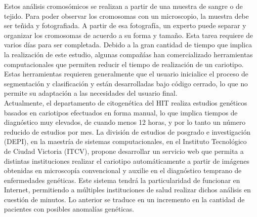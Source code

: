 \documentclass[12pt,letterpaper,titlepage]{article}
\begin{document}
Estos análisis cromosómicos se realizan a partir de una muestra de sangre o de tejido. Para poder observar los cromosomas con un microscopio, la muestra debe ser teñida y fotografiada. A partir de esa fotografía, un experto puede separar y organizar los cromosomas de acuerdo a su forma y tamaño. Esta tarea requiere de varios días para ser completada. Debido a la gran cantidad de tiempo que implica la realización de este estudio, algunas compañías han comercializado herramientas computacionales que permiten reducir el tiempo de realización de un cariotipo. Estas herramientas requieren generalmente que el usuario inicialice el proceso de segmentación y clasificación y están desarrolladas bajo código cerrado, lo que no permite su adaptación a las necesidades del usuario final. \\


Actualmente, el departamento de citogenética del HIT realiza estudios genéticos basados en cariotipos efectuados en forma manual, lo que implica tiempos de diagnóstico muy elevados, de cuando menos 12 horas, y por lo tanto un número reducido de estudios por mes. La división de estudios de posgrado e investigación (DEPI), en la maestría de sistemas computacionales, en el Instituto Tecnológico de Ciudad Victoria (ITCV), propone desarrollar un servicio web que permita a distintas instituciones realizar el cariotipo automáticamente a partir de imágenes obtenidas en microscopía convencional y auxilie en el diagnóstico temprano de enfermedades genéticas. Este sistema tendrá la particularidad de funcionar en Internet, permitiendo a múltiples instituciones de salud realizar dichos análisis en cuestión de minutos. Lo anterior se traduce en un incremento en la cantidad de pacientes con posibles anomalías genéticas. \\


\end{document}
